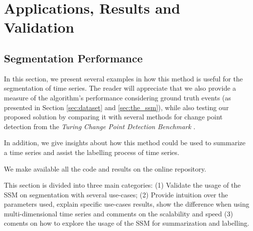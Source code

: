 

%

\chapter{Applications, Results and Validation}
\label{cha:results}




\section{Segmentation Performance}

In this section, we present several examples in how this method is useful for the segmentation of time series. The reader will appreciate that we also provide a measure of the algorithm's performance considering ground truth events (as presented in Section \ref{sec:dataset} and \ref{sec:the_ssm}), while also testing our proposed solution by comparing it with several methods for change point detection from the \textit{Turing Change Point Detection Benchmark} \cite{cpd_alan}.
\par
In addition, we give insights about how this method could be used to summarize a time series and assist the labelling process of time series.
\par
We make available all the code and results on the online repository.
\par
This section is divided into three main categories: (1) Validate the usage of the \gls{SSM} on segmentation with several use-cases; (2) Provide intuition over the parameters used, explain specific use-cases results, show the difference when using multi-dimensional time series and comments on the scalability and speed (3) coments on how to explore the usage of the \gls{SSM} for summarization and labelling.


